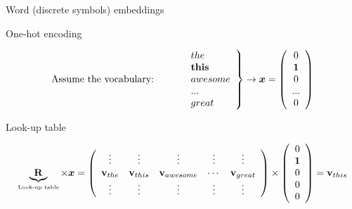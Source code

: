 \begin{frame}{Word (discrete symbols) embeddings}
  \begin{block}{One-hot encoding}
    \begin{center}
      \begin{displaymath}
        \textrm{Assume the vocabulary:~~~~~~~~~}
        \left.
          \begin{array}{l}
            the\\
            \mathbf{this}\\
            awesome\\
            ...\\
            great
          \end{array} 
        \right\} \rightarrow \boldsymbol{x} = 
        \left( 
          \begin{array}{c}
            0\\
            \mathbf{1}\\
            0\\
            ...\\
            0
          \end{array}
        \right)
      \end{displaymath}
    \end{center}
  \end{block}
  \begin{block}{Look-up table}
    \begin{center}
      \begin{displaymath} %
        \underbrace{\wmatrix}_{\textrm{\tiny Look-up table}} \times \x = 
        \left(
          \begin{array}{ccccc}
            \vdots &\vdots &\vdots &\vdots &\vdots \\
            \wvector_{the} & \wvector_{this} & \wvector_{awesome} & \cdots &  \wvector_{great}\\
            \vdots &\vdots &\vdots &\vdots &\vdots \\
          \end{array} 
        \right) \times 
        \left( 
          \begin{array}{c}
            0\\
            \mathbf{1}\\
            0\\
            0\\
            0
          \end{array} 
        \right)  = \wvector_{this} 
      \end{displaymath}
    \end{center}
  \end{block}
\end{frame}


